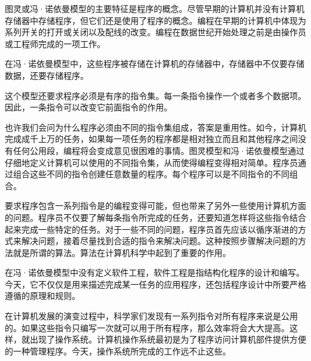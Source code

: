 图灵或冯·诺依曼模型的主要特征是程序的概念。尽管早期的计算机并没有计算机存储器中存储程序，但它们还是使用了程序的概念。编程在早期的计算机中体现为系列开关的打开或关闭以及配线的改变。编程在数据世纪开始处理之前是由操作员或工程师完成的一项工作。

在冯·诺依曼模型中，这些程序被存储在计算机的存储器中，存储器中不仅要存储数据，还要存储程序。

这个模型还要求程序必须是有序的指令集。每一条指令操作一个或者多个数据项。因此，一条指令可以改变它前面指令的作用。

也许我们会问为什么程序必须由不同的指令集组成，答案是重用性。如今，计算机完成成千上万的任务，如果每一项任务的程序都是相对独立而且和其他程序之间没有任何公用段，编程将会变成意见很困难的事情。图灵模型和冯·诺依曼模型通过仔细地定义计算机可以使用的不同指令集，从而使得编程变得相对简单。程序员通过组合这些不同的指令创建任意数量的程序。每个程序可以是不同指令的不同组合。

要求程序包含一系列指令是的编程变得可能，但也带来了另外一些使用计算机方面的问题。程序员不仅要了解每条指令所完成的任务，还要知道怎样将这些指令结合起来完成一些特定的任务。对于一些不同的问题，程序员首先应该以循序渐进的方式来解决问题，接着尽量找到合适的指令来解决问题。这种按照步骤解决问题的方法就是所谓的算法。算法在计算机科学中起到了重要的作用。

在冯·诺依曼模型中没有定义软件工程，软件工程是指结构化程序的设计和编写。今天，它不仅仅是用来描述完成某一任务的应用程序，还包括程序设计中所要严格遵循的原理和规则。

在计算机发展的演变过程中，科学家们发现有一系列指令对所有程序来说是公用的。如果这些指令只编写一次就可以用于所有程序，那么效率将会大大提高。这样，就出现了操作系统。计算机操作系统最初是为了程序访问计算机部件提供方便的一种管理程序。今天，操作系统所完成的工作远不止这些。


